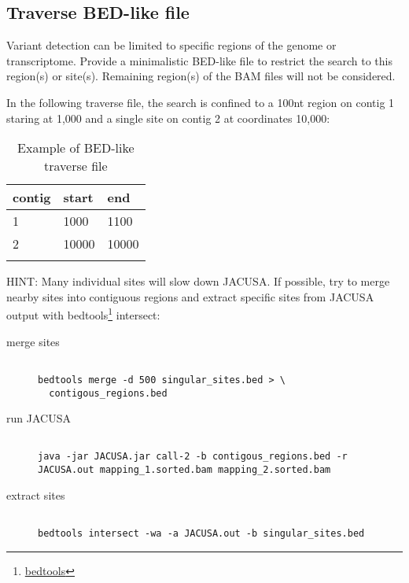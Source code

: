 \documentclass[10pt, a4paper]{article}
\begin{document}
\subsection{Traverse BED-like file}
Variant detection can be limited to specific regions of the genome or transcriptome.  Provide a
minimalistic BED-like file to restrict the search to this region(s) or site(s). Remaining region(s)
of the BAM files will not be considered.

In the following traverse file, the search is confined to a 100nt region on contig 1
staring at 1,000 and a single site on contig 2 at coordinates 10,000:
\begin{table}
\centering
\caption{Example of BED-like traverse file}
\label{tb:traverse_file}
\begin{tabular}{lll}
\textbf{contig} & \textbf{start} & \textbf{end} \\
\hline
1 & 1000 & 1100 \\
2 & 10000 & 10000 \\
\multicolumn{3}{c}{}
\end{tabular}
\end{table}
HINT: Many individual sites will slow down JACUSA. If possible, try to merge nearby sites into
contiguous regions and extract specific sites from JACUSA output with
bedtools\footnote{\href{http://bedtools.readthedocs.org/en/latest/}{bedtools}} intersect:
\begin{description}
\item[merge sites] \begin{verbatim} 

bedtools merge -d 500 singular_sites.bed > \ 
  contigous_regions.bed
\end{verbatim}
\item[run JACUSA] \begin{verbatim} 

java -jar JACUSA.jar call-2 -b contigous_regions.bed -r
JACUSA.out mapping_1.sorted.bam mapping_2.sorted.bam
\end{verbatim}
\item[extract sites] \begin{verbatim}

bedtools intersect -wa -a JACUSA.out -b singular_sites.bed
\end{verbatim}
\end{description}
\end{document}
